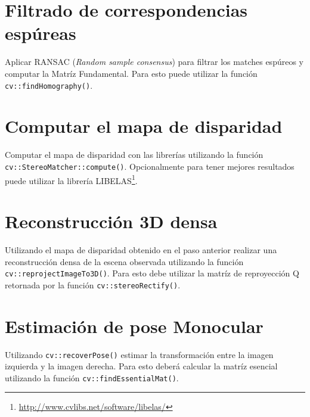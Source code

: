 \documentclass[tp]{lcc}
\begin{document}
\section{Filtrado de correspondencias espúreas}
Aplicar RANSAC (\emph{Random sample consensus}) para filtrar los matches espúreos y computar la Matríz Fundamental. Para esto puede utilizar la función \lstinline{cv::findHomography()}.

\section{Computar el mapa de disparidad}
Computar el mapa de disparidad con las librerías utilizando la función \lstinline{cv::StereoMatcher::compute()}. Opcionalmente para tener mejores resultados puede utilizar la librería LIBELAS\footnote{\url{http://www.cvlibs.net/software/libelas/}}.

\section{Reconstrucción 3D densa}
Utilizando el mapa de disparidad obtenido en el paso anterior realizar una reconstrucción densa de la escena observada utilizando la función \lstinline{cv::reprojectImageTo3D()}. Para esto debe utilizar la matríz de reproyección Q retornada por la función \lstinline{cv::stereoRectify()}.

\section{Estimación de pose Monocular}
Utilizando \lstinline{cv::recoverPose()} estimar la transformación entre la imagen izquierda y la imagen derecha. Para esto deberá calcular la matríz esencial utilizando la función \lstinline{cv::findEssentialMat()}.
\end{document}
